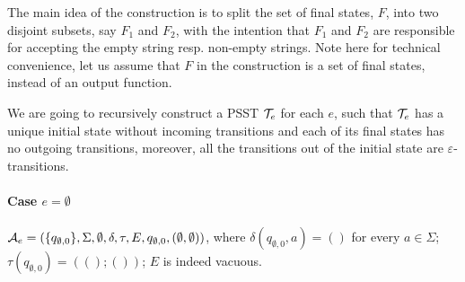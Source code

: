 %  








The main idea of the construction is to split the set of final states, $F$, into two disjoint subsets, say $F_1$ and $F_2$, with the intention that $F_1$  and $F_2$ are responsible for accepting the empty string resp. non-empty strings. Note here for technical convenience, let us assume that $F$ in the construction is a set of final states, instead of an output function.

We are going to recursively construct a PSST $\mathcal{T}_e$ for each {\pcre} $e$, such that 
     $\mathcal{T}_e$ has a unique initial state without incoming transitions and each of its final states has no outgoing transitions,
    moreover, all the transitions out of the initial state are $\varepsilon$-transitions. 

\paragraph{Case $e =\emptyset$} $\mathcal{A}_e = (\{q_{\emptyset, 0}\}, \Sigma, \emptyset, \delta, \tau, E, q_{\emptyset, 0}, (\emptyset, \emptyset))$, where $\delta(q_{\emptyset, 0}, a) = ()$ for every $a \in \Sigma$; $\tau(q_{\emptyset, 0}) = ((); ())$; $E$ is indeed vacuous.


